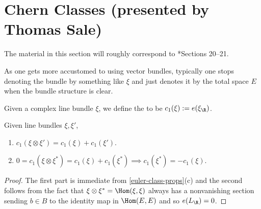 \documentclass[11pt,leqno,oneside]{amsbook}
\numberwithin{thm}{section}
\begin{document}
\section{Chern Classes  (presented by
  Thomas Sale)}
The material in this section will roughly correspond to
\cite{bott-tu}*{Sections 20--21}.
\begin{rmk}
  As one gets more accustomed to using vector bundles, typically one
  stops denoting the bundle by something like \(\xi\) and just denotes
  it by the total space \(E\) when the bundle structure is clear.
\end{rmk}
\begin{defn}
  Given a complex line bundle \(\xi\), we define the  to be \(c_1(\xi) :=
  e(\xi_\R)\).
\end{defn}
\begin{prop}
  Given line bundles \(\xi, \xi'\),
  \begin{enumerate}
  \item \(c_1(\xi \otimes \xi') = c_1(\xi) + c_1(\xi')\).
  \item \(0 = c_1(\xi \otimes \xi^*) = c_1(\xi) + c_1(\xi^*) \implies
    c_1(\xi^*) = -c_1(\xi)\).
  \end{enumerate}
\end{prop}
\begin{proof}
  The first part is immediate from \ref{euler-class-props}(c) and the
  second follows from the fact that \(\xi \otimes \xi^* =
  \Hom(\xi,\xi)\) always has a nonvanishing section sending \(b \in
  B\) to the identity map in \(\Hom(E,E)\) and so \(e(L_\R) = 0\).
\end{proof}
\end{document}
